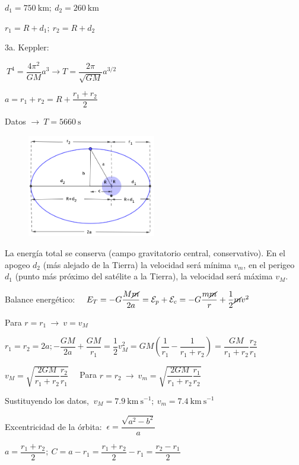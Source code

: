  \newpage %
 
 \begin{multicols}{2}
 $d_1=750\ \mathrm{km}; \ d_2=260\ \mathrm{km}$
 
 $r_1=R+d_1;\ r_2=R+d_2$
 
 
 3a. Keppler: 
 
 $\ T^4=\dfrac{4\pi^2}{GM}a^3 \to T=\dfrac{2\pi}{\sqrt{GM}}a^{3/2}$
 
 $a=r_1+r_2 =R+\dfrac{r_1+r_2}2$
 
 Datos $\to \ T=5660\ \mathrm{s}$
 	\begin{figure}[H]
	\centering
	\includegraphics[width=0.5\textwidth]{imagenes/imagenes15/T15IM07.png}
\end{figure}
 \end{multicols}

La energía total se conserva (campo gravitatorio central, conservativo). En el apogeo $d_2$ (más alejado de la Tierra) la velocidad será mínima $v_m$, en el perigeo $d_1$ (punto más próximo del satélite a la Tierra), la velocidad será máxima $v_M$.

Balance energético:
$\quad E_{T}=-G\dfrac{M\cancel{m}}{2a}=\mathcal E_p+\mathcal E_c=-G\dfrac{m\cancel{m}}{r}+\dfrac 1 2 \cancel{m} v^2$ 

Para $r=r_1 \ \to \ v=v_M$

$r_1=r_2=2a; -\dfrac{GM}{2a}+\dfrac{GM}{r_1}=\dfrac 1 2 v_M^2=GM\left( \dfrac{1}{r_1}-\dfrac{1}{r_1+r_2} \right)=\dfrac{GM}{r_1+r_2} \dfrac{r_2}{r_1}$

$ v_M=\sqrt{ \dfrac{2GM}{r_1+r_2} \dfrac{r_2}{r_1} } \quad $
Para $r=r_2 \ \to \ v_m=\sqrt{ \dfrac{2GM}{r_1+r_2} \dfrac{r_1}{r_2} }$

Sustituyendo los datos, $\ v_M=7.9\ \mathrm{km\ s}^{-1};\  v_m=7.4\ \mathrm{km\ s}^{-1}$

 Excentricidad de la órbita:  $\ \epsilon = \dfrac{\sqrt{a^2-b^2}}a$
 
 $a=\dfrac{r_1+r_2}{2};\ C=a-r_1=\dfrac{r_1+r_2}{2}-r_1=\dfrac{r_2-r_1}{2}$
 

